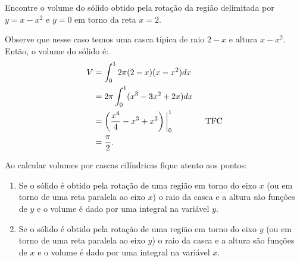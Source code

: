 \begin{example}
  Encontre o volume do sólido obtido pela rotação da região
  delimitada por $y = x - x^2$ e $y = 0$ em torno da reta $x = 2$.

  \solution
  Observe que nesse caso temos uma casca típica de raio $2-x$ e altura $x-x^2$.
  Então, o volume do sólido é:
  \begin{align*}
   V & = \int_0^1 2\pi(2- x)(x - x^2) dx \\
     & = 2\pi \int_0^1 (x^3-3x^2 +2x) dx  \\
     & = \left( \frac{x^4}{4}- x^3+x^2 \right) \bigg\rvert_{0}^{1}  \qquad\qquad\text{TFC} \\
     & = \frac{\pi}{2}.
  \end{align*}
\end{example}

Ao calcular volumes por cascas cilíndricas fique atento aos pontos:
\begin{enumerate}
  \item Se o sólido é obtido pela rotação de uma região em torno do eixo $x$
    (ou em torno de uma reta paralela ao eixo $x$) o raio da casca e a altura
    são funções de $y$ e o volume é dado por uma integral na variável $y$.

  \item Se o sólido é obtido pela rotação de uma região em torno do eixo $y$
    (ou em torno de uma reta paralela ao eixo $y$) o raio da casca e a altura
    são funções de $x$ e o volume é dado por uma integral na variável $x$.
\end{enumerate}

